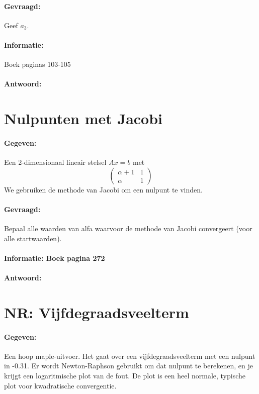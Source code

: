 \documentclass[12pt]{article}
\begin{document}
\paragraph{Gevraagd:} Geef $a_3$.
\paragraph{Informatie:} Boek paginas 103-105
\paragraph{Antwoord:}

\newpage

\section{Nulpunten met Jacobi}
\paragraph{Gegeven:} Een 2-dimensionaal lineair stelsel $Ax = b$ met
\[ \left( \begin{array}{cc}
\alpha+1 & 1  \\
\alpha & 1  \end{array} \right)\]
We gebruiken de methode van Jacobi om een nulpunt te vinden.
\paragraph{Gevraagd:} Bepaal alle waarden van alfa waarvoor de methode van Jacobi convergeert (voor alle startwaarden).
\paragraph{Informatie: Boek pagina 272}
\paragraph{Antwoord:}

\newpage

\section{NR: Vijfdegraadsveelterm}
\paragraph{Gegeven:} Een hoop maple-uitvoer. Het gaat over een vijfdegraadsveelterm met een nulpunt in -0.31. Er wordt Newton-Raphson gebruikt om dat nulpunt te berekenen, en je krijgt een logaritmische plot van de fout. De plot is een heel normale, typische plot voor kwadratische convergentie.
\end{document}
